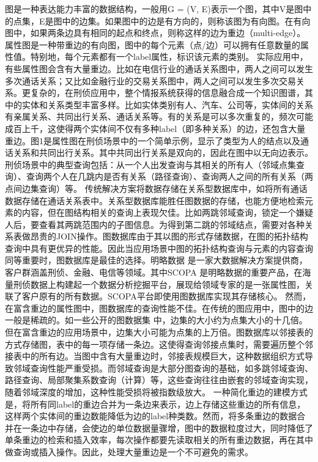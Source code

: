 
图是一种表达能力丰富的数据结构，一般用G = (V, E)表示一个图，其中V是图中的点集，E是图中的边集。如果图中的边是有方向的，则称该图为有向图。在有向图中，如果两条边具有相同的起点和终点，则称这样的边为重边（multi-edge）。属性图\supercite{property_graph}是一种带重边的有向图，图中的每个元素（点/边）可以拥有任意数量的属性值。特别地，每个元素都有一个label属性，标识该元素的类别。
实际应用中，有些属性图会含有大量重边。比如在电信行业的通话关系图中，两人之间可以发生多次通话关系；又比如金融行业的交易关系图中，两人之间可以发生多次交易关系。更复杂的，在刑侦应用中，整个情报系统获得的信息融合成一个知识图谱\supercite{knowledge_graph}，其中的实体和关系类型丰富多样。比如实体类别有人、汽车、公司等，实体间的关系有亲属关系、共同出行关系、通话关系等。有的关系是可以多次重复的，频次可能成百上千，这使得两个实体间不仅有多种label（即多种关系）的边，还包含大量重边。图1是属性图在刑侦场景中的一个简单示例，显示了类型为人的结点以及通话关系和共同出行关系。其中共同出行关系是双向的，因此在图中以无向边表示。刑侦场景中的典型查询包括：从一个人出发查询与其相关的所有人（邻域点集查询）、查询两个人在几跳内是否有关系（路径查询）、查询两人之间的所有关系（两点间边集查询）等。
传统解决方案将数据存储在关系型数据库中，如将所有通话数据存储在通话关系表中。关系型数据库能胜任图数据的存储，也能方便地检索元素的内容，但在图结构相关的查询上表现欠佳。比如两跳邻域查询，锁定一个嫌疑人后，要查看其两跳范围内的子图信息。为得到第二跳的邻域结点，需要对各种关系表做昂贵的JOIN操作。图数据库由于其以图的形式存储数据，在图的拓扑结构查询中具有更优异的性能。因此当应用场景中图的拓扑结构查询与元素的内容查询同等重要时，图数据库是最佳的选择。明略数据 是一家大数据解决方案提供商，客户群涵盖刑侦、金融、电信等领域。其中SCOPA 是明略数据的重要产品，在海量刑侦数据上构建起一个数据分析挖掘平台，展现给领域专家的是一张属性图，关联了客户原有的所有数据。SCOPA平台即使用图数据库实现其存储核心。
然而，在富含重边的属性图中，图数据库的查询性能不佳。在传统的图应用中，图中的边一般是稀疏的。如一些公开的图数据集 中，边集的大小约为点集大小的十几倍。但在富含重边的应用场景中，边集大小可能为点集的上万倍。图数据库以邻接表的方式存储图，表中的每一项存储一条边。这使得查询邻接点集时，需要遍历整个邻接表中的所有边。当图中含有大量重边时，邻接表规模巨大，这种数据组织方式导致邻域查询性能严重受损。而邻域查询是大部分图查询的基础，如多跳邻域查询、路径查询、局部聚集系数查询（计算）等，这些查询往往由嵌套的邻域查询实现，随着邻域深度的增加，这种性能受损将被指数级放大。
一种简化重边的建模方式是，将所有同label的重边合并为一条边来表示，边上存储这些重边的所有信息，这样两个实体间的重边数能降低为边的label种类数。然而，将多条重边的数据合并在一条边中存储，会使边的单位数据量骤增，图中的数据粒度过大，同时降低了单条重边的检索和插入效率，每次操作都要先读取相关的所有重边数据，再在其中做查询或插入操作。因此，处理大量重边是一个不可避免的需求。
